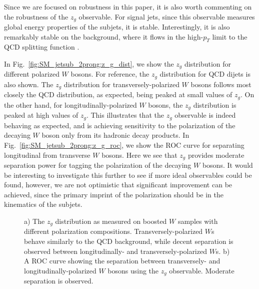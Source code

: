 Since we are focused on robustness in this paper, it is also worth commenting on the robustness of the $z_g$ observable. For signal jets, since this observable measures global energy properties of the subjets, it is stable.
%
Interestingly, it is also remarkably stable on the background, where it flows in the high-$p_T$ limit to the QCD splitting function \cite{Larkoski:2015lea}.

In Fig.~\ref{fig:SM_jetsub_2prong:z_g_dist}, we show the $z_g$ distribution for different polarized $W$ bosons.
%
For reference, the $z_g$ distribution for QCD dijets is also shown.
%
The $z_g$ distribution for transversely-polarized $W$ bosons follows most closely the QCD distribution, as expected, being peaked at small values of $z_g$.
%
On the other hand, for longitudinally-polarized $W$ bosons, the $z_g$ distribution is peaked at high values of $z_g$.
%
This illustrates that the $z_g$ observable is indeed behaving as expected, and is achieving sensitivity to the polarization of the decaying $W$ boson only from its hadronic decay products.
%
In Fig.~\ref{fig:SM_jetsub_2prong:z_g_roc}, we show  the ROC curve for separating longitudinal from transverse $W$ bosons.
%
Here we see that $z_g$ provides moderate separation power for tagging the polarization of the decaying $W$ bosons.
%
It would be interesting to investigate this further to see if more ideal observables could be found, however, we are not optimistic that significant improvement can be achieved, since the primary imprint of the polarization should be in the kinematics of the subjets.

\begin{figure}
\begin{center}
\end{center}
\caption{a) The $z_g$ distribution as measured on boosted $W$ samples with different polarization compositions. Transversely-polarized $W$s behave similarly to the QCD background, while decent separation is observed between longitudinally- and transversely-polarized $W$s. b) A ROC curve showing the separation between transversely- and longitudinally-polarized $W$ bosons using the $z_g$ observable. Moderate separation is observed.}
\end{figure}



